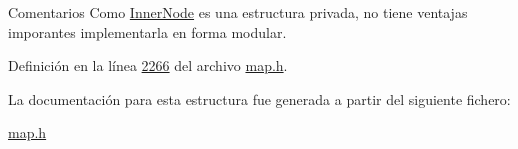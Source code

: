 \begin{DoxyRemark}{Comentarios}
Como \hyperlink{structaed2_1_1map_1_1InnerNode}{Inner\+Node} es una estructura privada, no tiene ventajas imporantes implementarla en forma modular. 
\end{DoxyRemark}


Definición en la línea \hyperlink{map_8h_source_l02266}{2266} del archivo \hyperlink{map_8h_source}{map.\+h}.



La documentación para esta estructura fue generada a partir del siguiente fichero\+:\begin{DoxyCompactItemize}
\item 
\hyperlink{map_8h}{map.\+h}\end{DoxyCompactItemize}
